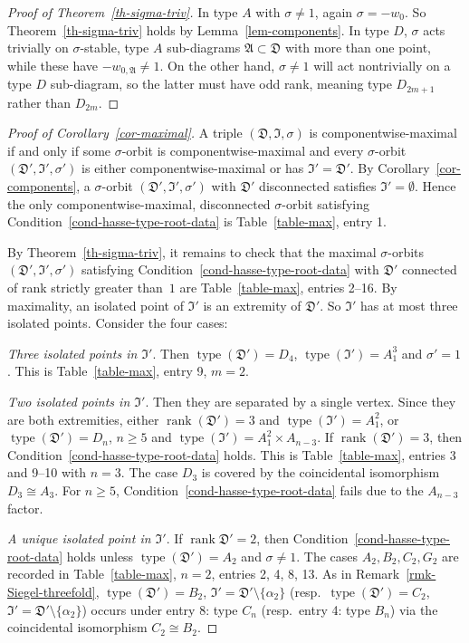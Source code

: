 \documentclass[11pt]{amsart}
\numberwithin{equation}{section}
\theoremstyle{definition}
\theoremstyle{remark}
\newcommand{\Afr}{{\mathfrak A}}
\newcommand{\Dfr}{{\mathfrak D}}
\newcommand{\Ifr}{{\mathfrak I}}
\DeclareMathOperator{\rank}{rank}
\DeclareMathOperator{\type}{type}
\begin{document}
\begin{proof}[Proof of Theorem~\ref{th-sigma-triv}]
In type $A$ with $\sigma \neq 1$, again $\sigma=-w_0$. So Theorem~\ref{th-sigma-triv} holds by Lemma~\ref{lem-components}.
In type $D$, $\sigma$ acts trivially on $\sigma$-stable, type $A$ sub-diagrams $\Afr \subset \Dfr$ with more than one point, while these have $-w_{0,\Afr} \neq 1$. On the other hand, $\sigma \neq 1$ will act nontrivially on a type $D$ sub-diagram, so the latter must have odd rank, meaning type $D_{2m+1}$  rather than $D_{2m}$. 
\end{proof}

\begin{proof}[Proof of Corollary~\ref{cor-maximal}]
A triple $(\Dfr, \Ifr, \sigma)$ is componentwise-maximal if and only if some $\sigma$-orbit is componentwise-maximal and every  $\sigma$-orbit $(\Dfr', \Ifr', \sigma')$ is either componentwise-maximal or has $\Ifr'=\Dfr'$. By Corollary~\ref{cor-components}, a $\sigma$-orbit $(\Dfr', \Ifr', \sigma')$ with $\Dfr'$ disconnected satisfies $\Ifr'=\emptyset$. Hence the only componentwise-maximal, disconnected $\sigma$-orbit satisfying Condition~\ref{cond-hasse-type-root-data} is Table~\ref{table-max}, entry 1.

By Theorem~\ref{th-sigma-triv}, it remains to check that the maximal $\sigma$-orbits $(\Dfr', \Ifr', \sigma')$ satisfying Condition~\ref{cond-hasse-type-root-data} with $\Dfr'$ connected of rank strictly greater than~$1$ are Table~\ref{table-max}, entries 2--16.   
By maximality, an isolated point of $\Ifr'$  is an extremity of $\Dfr'$. So $\Ifr'$ has at most three isolated points. Consider the  four cases:

\textit{Three isolated points in $\Ifr'$}. Then  $\type(\Dfr')=D_4$, $\type(\Ifr')=A_1^3$ and $\sigma'=1$. This is Table~\ref{table-max}, entry 9, $m=2$. 

\textit{Two isolated points in $\Ifr'$}. Then they are separated by a single vertex. Since they are both extremities, either $\rank(\Dfr')=3$ and $\type(\Ifr')=A_1^2$, or $\type(\Dfr')=D_n$, $n \geq 5$ and $\type (\Ifr')=A_1^2 \times A_{n-3}$. 
If $\rank (\Dfr')=3$, then Condition~\ref{cond-hasse-type-root-data} holds. This is Table~\ref{table-max}, entries 3 and 9--10 with $n=3$. 
The case $D_3$ is covered by the coincidental isomorphism $D_3 \cong A_3$.
For $n \geq 5$, Condition~\ref{cond-hasse-type-root-data} fails due to the $A_{n-3}$ factor.

\textit{A unique isolated point in $\Ifr'$}.
If $\rank \Dfr'=2$, then Condition~\ref{cond-hasse-type-root-data} holds unless $\type(\Dfr')=A_2$ and $\sigma \neq 1$. The cases $A_2,B_2, C_2, G_2$ are recorded in Table~\ref{table-max}, $n=2$, entries 2, 4, 8, 13.
As in Remark~\ref{rmk-Siegel-threefold}, $\type(\Dfr')=B_2$, $\Ifr'=\Dfr' \setminus \{\alpha_2\}$ (resp.\ $\type(\Dfr')=C_2$, $\Ifr'=\Dfr' \setminus \{\alpha_2\}$) occurs under entry 8: type $C_n$ (resp.\ entry 4: type $B_n$) via the coincidental isomorphism $C_2 \cong B_2$. 


\end{proof}
\end{document}
